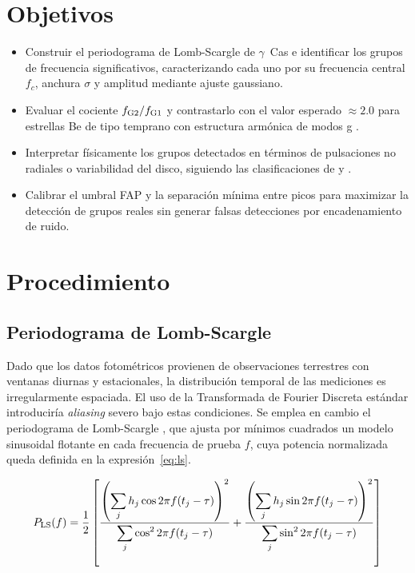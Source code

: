 \documentclass[letterpaper,12pt]{extarticle}
\begin{document}
\section{Objetivos}

\begin{itemize}
    \item Construir el periodograma de Lomb-Scargle de $\gamma$~Cas e identificar los grupos de frecuencia significativos, caracterizando cada uno por su frecuencia central $f_c$, anchura $\sigma$ y amplitud mediante ajuste gaussiano.
    \item Evaluar el cociente $f_{\rm G2}/f_{\rm G1}$ y contrastarlo con el valor esperado $\approx 2.0$ para estrellas Be de tipo temprano con estructura armónica de modos g \cite{labadiebartz2022}.
    \item Interpretar físicamente los grupos detectados en términos de pulsaciones no radiales o variabilidad del disco, siguiendo las clasificaciones de \cite{labadiebartz2022} y \cite{sabogal2014}.
    \item Calibrar el umbral FAP y la separación mínima entre picos para maximizar la detección de grupos reales sin generar falsas detecciones por encadenamiento de ruido.
\end{itemize}


\section{Procedimiento}

\subsection{Periodograma de Lomb-Scargle}

Dado que los datos fotométricos provienen de observaciones terrestres con ventanas diurnas y estacionales, la distribución temporal de las mediciones es irregularmente espaciada. El uso de la Transformada de Fourier Discreta estándar introduciría \textit{aliasing} severo bajo estas condiciones. Se emplea en cambio el periodograma de Lomb-Scargle \cite{lomb_1976,scargle_1982}, que ajusta por mínimos cuadrados un modelo sinusoidal flotante en cada frecuencia de prueba $f$, cuya potencia normalizada queda definida en la expresión~\ref{eq:ls}.

\begin{equation}
    P_{\rm LS}(f) = \frac{1}{2}\left[
        \frac{\left(\displaystyle\sum_j h_j \cos 2\pi f(t_j-\tau)\right)^2}
             {\displaystyle\sum_j \cos^2 2\pi f(t_j-\tau)}
      + \frac{\left(\displaystyle\sum_j h_j \sin 2\pi f(t_j-\tau)\right)^2}
             {\displaystyle\sum_j \sin^2 2\pi f(t_j-\tau)}
    \right]
    \label{eq:ls}
\end{equation}
\end{document}
